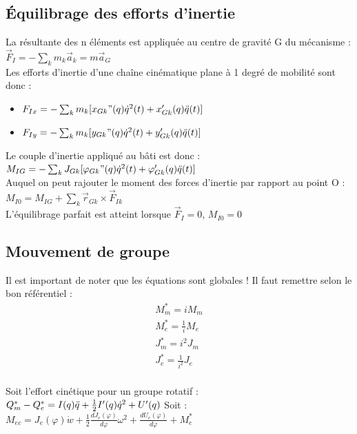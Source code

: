 \documentclass[../main.tex]{subfiles}
\begin{document}
\subsection{Équilibrage des efforts d'inertie}
La résultante des n éléments est appliquée au centre de gravité G du mécanisme : $\Vec{F}_I = -\sum_k m_k \Vec{a}_k = m\Vec{a}_G$\\

Les efforts d'inertie d'une chaîne cinématique plane à 1 degré de mobilité sont donc : \begin{itemize}
    \item $F_{Ix} = -\sum_k m_k [x_{Gk}"(q) \dot{q}^2(t) + x_{Gk}'(q) \Ddot{q}(t)]$\\
    \item $F_{Iy} = -\sum_k m_k [y_{Gk}"(q) \dot{q}^2(t) + y_{Gk}'(q) \Ddot{q}(t)]$\\
\end{itemize}

Le couple d'inertie appliqué au bâti est donc : $M_{IG} = -\sum_k J_{Gk} [\varphi_{Gk}"(q) \dot{q}^2(t) + \varphi_{Gk}'(q) \Ddot{q}(t)]$\\

Auquel on peut rajouter le moment des forces d'inertie par rapport au point O : $M_{I0} = M_{IG} + \sum_k \Vec{r}_{Gk} \times \Vec{F}_{Ik}$\\

L'équilibrage parfait est atteint lorsque $\Vec{F}_I = 0$, $M_{I0} = 0$\\

\subsection{Mouvement de groupe}
\warning Il est important de noter que les équations sont globales ! Il faut remettre selon le bon référentiel : \begin{equation}
    \begin{gathered}
        M_m^* = i M_m\\
        M_e^* = \frac{1}{i} M_e\\
        J_m^* = i^2 J_m\\
        J_e^* = \frac{1}{i^2} J_e\\
    \end{gathered}
\end{equation}


Soit l'effort cinétique pour un groupe rotatif : $Q_m^* - Q_e^* = I(q) \Ddot{q} + \frac{1}{2} I'(q) \dot{q}^2 + U'(q)$
Soit : $M_{ec} = J_e(\varphi) \dot{w} + \frac{1}{2} \frac{d J_e (\varphi)}{d\varphi} \omega^2 + \frac{d U_e (\varphi)}{d\varphi} + M_e^*$\\
\end{document}
